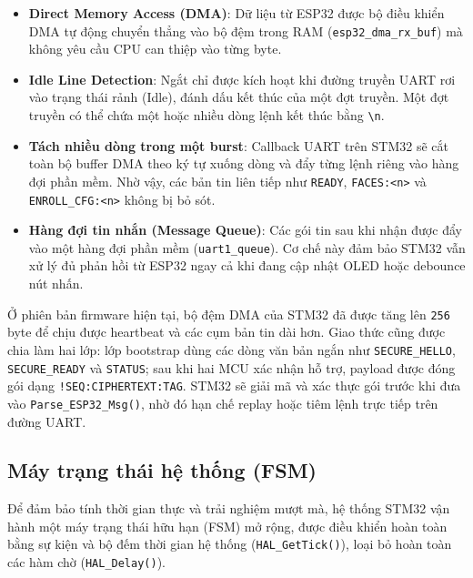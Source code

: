 \begin{itemize}
  \item \textbf{Direct Memory Access (DMA)}: Dữ liệu từ ESP32 được bộ điều khiển DMA tự động chuyển thẳng vào bộ đệm trong RAM (\texttt{esp32\_dma\_rx\_buf}) mà không yêu cầu CPU can thiệp vào từng byte.
  \item \textbf{Idle Line Detection}: Ngắt chỉ được kích hoạt khi đường truyền UART rơi vào trạng thái rảnh (Idle), đánh dấu kết thúc của một đợt truyền. Một đợt truyền có thể chứa một hoặc nhiều dòng lệnh kết thúc bằng \texttt{\textbackslash n}.
  \item \textbf{Tách nhiều dòng trong một burst}: Callback UART trên STM32 sẽ cắt toàn bộ buffer DMA theo ký tự xuống dòng và đẩy từng lệnh riêng vào hàng đợi phần mềm. Nhờ vậy, các bản tin liên tiếp như \texttt{READY}, \texttt{FACES:<n>} và \texttt{ENROLL\_CFG:<n>} không bị bỏ sót.
  \item \textbf{Hàng đợi tin nhắn (Message Queue)}: Các gói tin sau khi nhận được đẩy vào một hàng đợi phần mềm (\texttt{uart1\_queue}). Cơ chế này đảm bảo STM32 vẫn xử lý đủ phản hồi từ ESP32 ngay cả khi đang cập nhật OLED hoặc debounce nút nhấn.
\end{itemize}

Ở phiên bản firmware hiện tại, bộ đệm DMA của STM32 đã được tăng lên \texttt{256} byte để chịu được heartbeat và các cụm bản tin dài hơn. Giao thức cũng được chia làm hai lớp: lớp bootstrap dùng các dòng văn bản ngắn như \texttt{SECURE\_HELLO}, \texttt{SECURE\_READY} và \texttt{STATUS}; sau khi hai MCU xác nhận hỗ trợ, payload được đóng gói dạng \texttt{!SEQ:CIPHERTEXT:TAG}. STM32 sẽ giải mã và xác thực gói trước khi đưa vào \texttt{Parse\_ESP32\_Msg()}, nhờ đó hạn chế replay hoặc tiêm lệnh trực tiếp trên đường UART.

\subsection{Máy trạng thái hệ thống (FSM)}

Để đảm bảo tính thời gian thực và trải nghiệm mượt mà, hệ thống STM32 vận hành một máy trạng thái hữu hạn (FSM) mở rộng, được điều khiển hoàn toàn bằng sự kiện và bộ đếm thời gian hệ thống (\texttt{HAL\_GetTick()}), loại bỏ hoàn toàn các hàm chờ (\texttt{HAL\_Delay()}).

